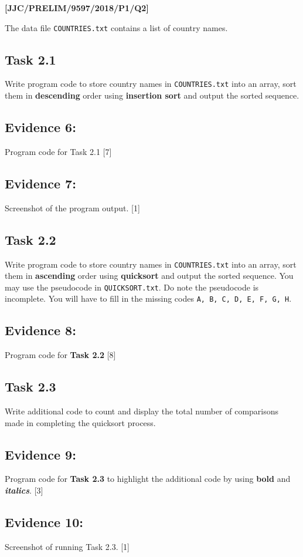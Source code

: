 \item \textbf{{[}JJC/PRELIM/9597/2018/P1/Q2{]} }

The data file \texttt{COUNTRIES.txt} contains a list of country names. 

\subsection*{Task 2.1}

Write program code to store country names in \texttt{COUNTRIES.txt}
into an array, sort them in \textbf{descending} order using \textbf{insertion
sort} and output the sorted sequence. 

\subsection*{Evidence 6: }

Program code for Task 2.1 \hfill{} {[}7{]}

\subsection*{Evidence 7: }

Screenshot of the program output. \hfill{} {[}1{]}

\subsection*{Task 2.2 }

Write program code to store country names in \texttt{COUNTRIES.txt}
into an array, sort them in \textbf{ascending} order using \textbf{quicksort}
and output the sorted sequence. You may use the pseudocode in \texttt{QUICKSORT.txt}.
Do note the pseudocode is incomplete. You will have to fill in the
missing codes \texttt{A, B, C, D, E, F, G, H}. 

\subsection*{Evidence 8: }

Program code for \textbf{Task 2.2} \hfill{} {[}8{]}

\subsection*{Task 2.3 }

Write additional code to count and display the total number of comparisons
made in completing the quicksort process.

\subsection*{Evidence 9: }

Program code for \textbf{Task 2.3} to highlight the additional code
by using \textbf{bold} and \textbf{\emph{italics}}. \hfill{} {[}3{]}

\subsection*{Evidence 10:}

Screenshot of running Task 2.3.\hfill{} {[}1{]}